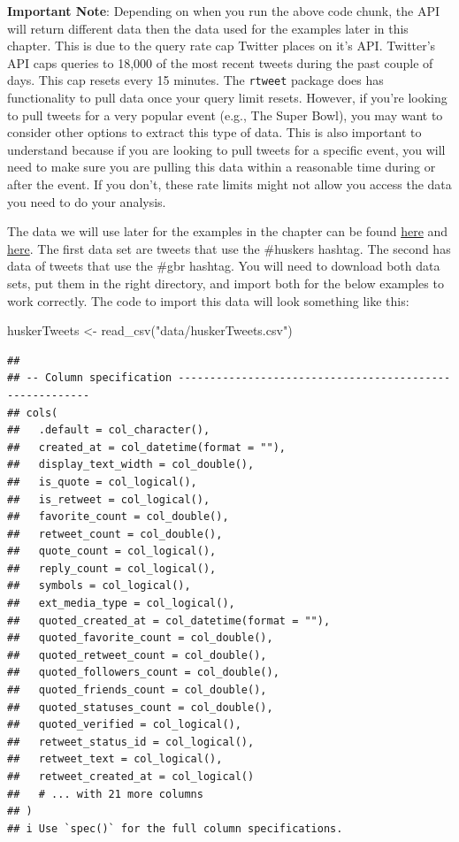 \documentclass[
]{book}
\newenvironment{Shaded}{\begin{snugshade}}{\end{snugshade}}
\newcommand{\FunctionTok}[1]{\textcolor[rgb]{0.00,0.00,0.00}{#1}}
\newcommand{\NormalTok}[1]{#1}
\newcommand{\OtherTok}[1]{\textcolor[rgb]{0.56,0.35,0.01}{#1}}
\newcommand{\StringTok}[1]{\textcolor[rgb]{0.31,0.60,0.02}{#1}}
\begin{document}
\textbf{Important Note}: Depending on when you run the above code chunk, the API will return different data then the data used for the examples later in this chapter. This is due to the query rate cap Twitter places on it's API. Twitter's API caps queries to 18,000 of the most recent tweets during the past couple of days. This cap resets every 15 minutes. The \texttt{rtweet} package does has functionality to pull data once your query limit resets. However, if you're looking to pull tweets for a very popular event (e.g., The Super Bowl), you may want to consider other options to extract this type of data. This is also important to understand because if you are looking to pull tweets for a specific event, you will need to make sure you are pulling this data within a reasonable time during or after the event. If you don't, these rate limits might not allow you access the data you need to do your analysis.

The data we will use later for the examples in the chapter can be found \href{https://unl.box.com/s/x4jjifc394gxfvsvbwb3csez2ne4l4rb}{here} and \href{https://unl.box.com/s/s4ej8khwi9ah9qvqpi2jviqomfocie3n}{here}. The first data set are tweets that use the \#huskers hashtag. The second has data of tweets that use the \#gbr hashtag. You will need to download both data sets, put them in the right directory, and import both for the below examples to work correctly. The code to import this data will look something like this:

\begin{Shaded}
\begin{Highlighting}[]
\NormalTok{huskerTweets }\OtherTok{\textless{}{-}} \FunctionTok{read\_csv}\NormalTok{(}\StringTok{"data/huskerTweets.csv"}\NormalTok{)}
\end{Highlighting}
\end{Shaded}

\begin{verbatim}
## 
## -- Column specification --------------------------------------------------------
## cols(
##   .default = col_character(),
##   created_at = col_datetime(format = ""),
##   display_text_width = col_double(),
##   is_quote = col_logical(),
##   is_retweet = col_logical(),
##   favorite_count = col_double(),
##   retweet_count = col_double(),
##   quote_count = col_logical(),
##   reply_count = col_logical(),
##   symbols = col_logical(),
##   ext_media_type = col_logical(),
##   quoted_created_at = col_datetime(format = ""),
##   quoted_favorite_count = col_double(),
##   quoted_retweet_count = col_double(),
##   quoted_followers_count = col_double(),
##   quoted_friends_count = col_double(),
##   quoted_statuses_count = col_double(),
##   quoted_verified = col_logical(),
##   retweet_status_id = col_logical(),
##   retweet_text = col_logical(),
##   retweet_created_at = col_logical()
##   # ... with 21 more columns
## )
## i Use `spec()` for the full column specifications.
\end{verbatim}
\end{document}
